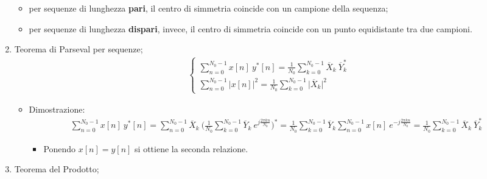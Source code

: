 \documentclass[
]{article}
\providecommand{\tightlist}{%
  \setlength{\itemsep}{0pt}\setlength{\parskip}{0pt}}
\begin{document}
\begin{enumerate}
  \begin{itemize}
  \tightlist
  \item
    per sequenze di lunghezza \textbf{pari}, il centro di simmetria
    coincide con un campione della sequenza;
  \item
    per sequenze di lunghezza \textbf{dispari}, invece, il centro di
    simmetria coincide con un punto equidistante tra due campioni.
  \end{itemize}
\item
  Teorema di Parseval per sequenze; \begin{gather*}
  \left\{ \begin{array}{cl} \displaystyle
  \sum_{n=0}^{N_0 -1} x[n] \ y^{*}[n] = \frac{1}{N_0} \sum_{k=0}^{N_0 -1}\overline{X}_k \ \overline{Y}^{*}_{k} \\
  \displaystyle\sum_{n=0}^{N_0 -1} \Big|x[n]\Big|^{2} = \frac{1}{N_0} \sum_{k=0}^{N_0 -1} \Big|\overline{X}_{k}\Big|^{2}
  \end{array} \right.
  \end{gather*}

  \begin{itemize}
  \tightlist
  \item
    Dimostrazione: \begin{gather*}
    \sum_{n=0}^{N_0 -1} x[n] \ y^{*}[n] =\sum_{n=0}^{N_0 -1}\overline{X}_k \ \Big(\frac{1}{N_0}\sum_{k=0}^{N_0 - 1}\overline{Y}_k \ e^{j\frac{2\pi kn}{N_0}}\Big)^{*} 
    = \frac{1}{N_0} \sum_{k=0}^{N_0 -1} \overline{Y}_k \sum_{n=0}^{N_0 -1 }x[n] \ e^{-j\frac{2\pi kn}{N_0}} = \frac{1}{N_0} \sum_{k=0}^{N_0 -1} \overline{X}_k \ \overline{Y}^{*}_k
    \end{gather*}

    \begin{itemize}
    \tightlist
    \item
      Ponendo \(x[n]=y[n]\) si ottiene la seconda relazione.
    \end{itemize}
  \end{itemize}
\item
  Teorema del Prodotto;


\end{enumerate}
\end{document}
